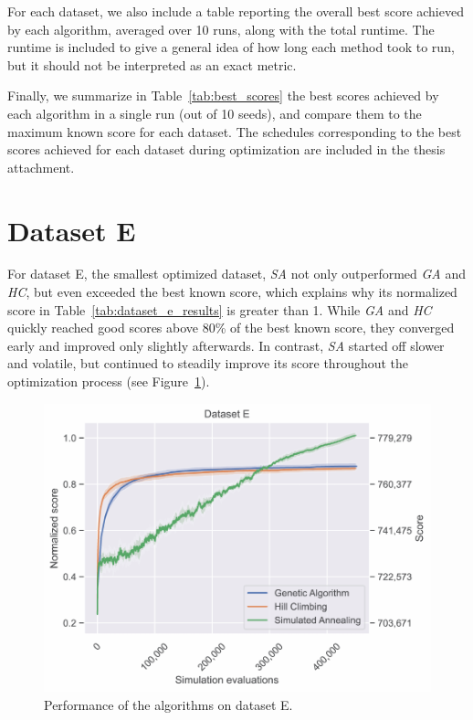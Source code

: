 For each dataset, we also include a table reporting the overall best score achieved by each algorithm, averaged over 10 runs, along with the total runtime. The runtime is included to give a general idea of how long each method took to run, but it should not be interpreted as an exact metric.

Finally, we summarize in Table~\ref{tab:best_scores} the best scores achieved by each algorithm in a single run (out of 10 seeds), and compare them to the maximum known score for each dataset. The schedules corresponding to the best scores achieved for each dataset during optimization are included in the thesis attachment.

\newpage
\section{Dataset E} \label{sec:dataset_e}

For dataset E, the smallest optimized dataset, \textit{SA} not only outperformed \textit{GA} and \textit{HC}, but even exceeded the best known score, which explains why its normalized score in Table~\ref{tab:dataset_e_results} is greater than 1. While \textit{GA} and \textit{HC} quickly reached good scores above 80\% of the best known score, they converged early and improved only slightly afterwards. In contrast, \textit{SA} started off slower and volatile, but continued to steadily improve its score throughout the optimization process (see Figure~\ref{fig:dataset_e_experiment}).

\bigskip

\begin{figure}[h]
    \centering
    \includegraphics[width=\linewidth]{img/experiments/pdfa-e_Genetic_Algorithm_Hill_Climbing_Simulated_Annealing.pdf}
    \caption[Performance of the algorithms on dataset E]{
        Performance of the algorithms on dataset E.
    }
    \label{fig:dataset_e_experiment}
\end{figure}

